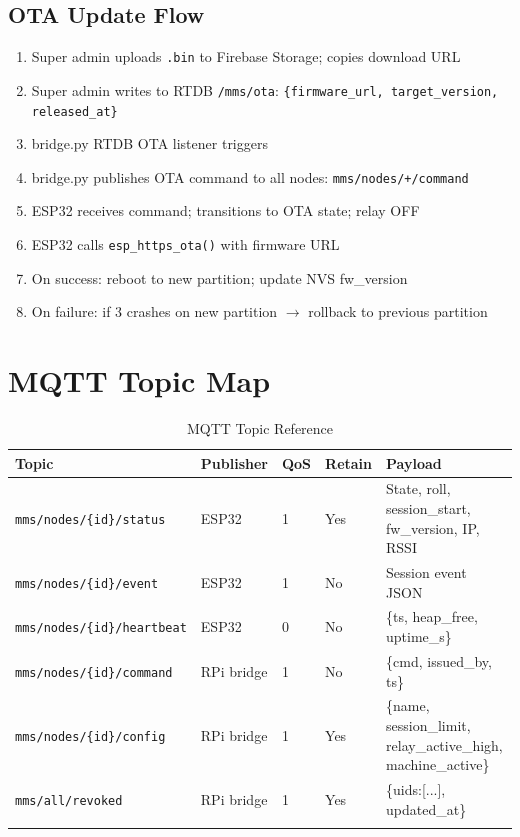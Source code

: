 \subsection{OTA Update Flow}

\begin{enumerate}[leftmargin=1.5em]
    \item Super admin uploads \texttt{.bin} to Firebase Storage; copies download URL
    \item Super admin writes to RTDB \texttt{/mms/ota}: \texttt{\{firmware\_url, target\_version, released\_at\}}
    \item bridge.py RTDB OTA listener triggers
    \item bridge.py publishes OTA command to all nodes: \texttt{mms/nodes/+/command}
    \item ESP32 receives command; transitions to OTA state; relay OFF
    \item ESP32 calls \texttt{esp\_https\_ota()} with firmware URL
    \item On success: reboot to new partition; update NVS fw\_version
    \item On failure: if 3 crashes on new partition $\rightarrow$ rollback to previous partition
\end{enumerate}

\section{MQTT Topic Map}

\begin{longtable}{L{5cm}L{2.5cm}C{1.5cm}C{1.5cm}L{4.5cm}}
\toprule
\textbf{Topic} & \textbf{Publisher} & \textbf{QoS} & \textbf{Retain} & \textbf{Payload} \\
\midrule
\endhead
\texttt{mms/nodes/\{id\}/status} & ESP32 & 1 & Yes & State, roll, session\_start, fw\_version, IP, RSSI \\
\texttt{mms/nodes/\{id\}/event} & ESP32 & 1 & No & Session event JSON \\
\texttt{mms/nodes/\{id\}/heartbeat} & ESP32 & 0 & No & \{ts, heap\_free, uptime\_s\} \\
\texttt{mms/nodes/\{id\}/command} & RPi bridge & 1 & No & \{cmd, issued\_by, ts\} \\
\texttt{mms/nodes/\{id\}/config} & RPi bridge & 1 & Yes & \{name, session\_limit, relay\_active\_high, machine\_active\} \\
\texttt{mms/all/revoked} & RPi bridge & 1 & Yes & \{uids:[...], updated\_at\} \\
\bottomrule
\caption{MQTT Topic Reference}
\label{tab:mqtt_topics}
\end{longtable}

